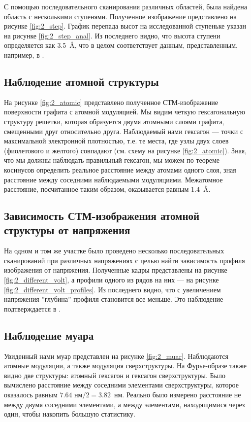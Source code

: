 \documentclass[a4paper, 12pt]{article}
\begin{document}
	С помощью последовательного сканирования различных областей, была найдена область с несколькими ступенями. Полученное изображение представлено на рисунке \ref{fig:2_step}. График перепада высот на исследованной ступеньке указан на рисунке \ref{fig:2_step_anal}. Из последнего видно, что высота ступени определяется как $3.5$~\AA, что в целом соответствует данным, представленным, например, в \cite{Article}.
	
	\subsection{Наблюдение атомной структуры}
	
	На рисунке \ref{fig:2_atomic} представлено полученное СТМ-изображение поверхности графита с атомной модуляцией. Мы видим четкую гексагональную структуру решетки, которая образуется двумя атомными слоями графита, смещенными друг относительно друга. Наблюдаемый нами гексагон --- точки с максимальной электронной плотностью, т.е. те места, где узлы двух слоев (фиолетового и желтого) совпадают (см. схему на рисунке \ref{fig:2_atomic}). Зная, что мы должны наблюдать правильный гексагон, мы можем по теореме косинусов определить реальное расстояние между атомами одного слоя, зная расстояние между соседними наблюдаемыми модуляциями. Межатомное расстояние, посчитанное таким образом, оказывается равным $1.4$~\AA. 
	
	
	
	\subsection{Зависимость СТМ-изображения атомной структуры от напряжения}
	
	На одном и том же участке было проведено несколько последовательных сканирований при различных напряжениях с целью найти зависимость профиля изображения от напряжения. Полученные кадры представлены на рисунке \ref{fig:2_different_volt}, а профили одного из рядов на них --- на рисунке \ref{fig:2_different_volt_profiles}. Из последнего видно, что с увеличением напряжения ''глубина'' профиля становится все меньше. Это наблюдение подтверждается в \cite{STM_Binnig}.
	
	\subsection{Наблюдение муара}
	
	Увиденный нами муар представлен на рисунке \ref{fig:2_muar}. Наблюдаются атомные модуляции, а также модуляция сверхструктуры. На Фурье-образе также видно две структуры: атомный гексагон и гексагон сверхструктуры. Было вычислено расстояние между соседними элементами сверхструктуры, которое оказалось равным $7.64\text{ нм}/2 = 3.82$~нм. Реально было измерено расстояние не между двумя соседними элементами, а между элементами, находящимися через один, чтобы накопить большую статистику.
	
\end{document}
